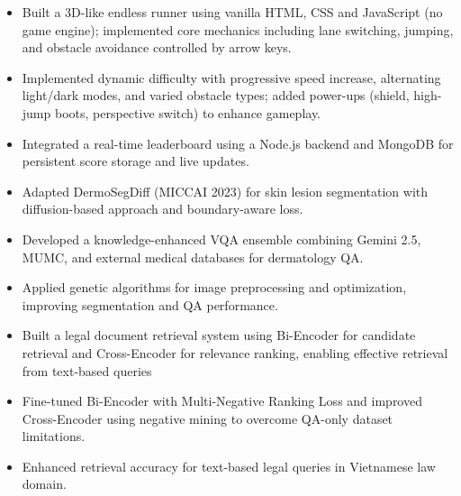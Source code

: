 \documentclass[11pt,a4paper,sans]{moderncv}
\begin{document}
{\begin{itemize}

  \item Built a 3D-like endless runner using vanilla HTML, CSS and JavaScript (no game engine); implemented core mechanics including lane switching, jumping, and obstacle avoidance controlled by arrow keys.

  \item Implemented dynamic difficulty with progressive speed increase, alternating light/dark modes, and varied obstacle types; added power-ups (shield, high-jump boots, perspective switch) to enhance gameplay.

  \item Integrated a real-time leaderboard using a Node.js backend and MongoDB for persistent score storage and live updates.

\end{itemize}}




{\begin{itemize}

  \item Adapted DermoSegDiff (MICCAI 2023) for skin lesion segmentation with diffusion-based approach and boundary-aware loss.

  \item Developed a knowledge-enhanced VQA ensemble combining Gemini 2.5, MUMC, and external medical databases for dermatology QA.

  \item Applied genetic algorithms for image preprocessing and optimization, improving segmentation and QA performance.

\end{itemize}}




{\begin{itemize}

  \item Built a legal document retrieval system using Bi-Encoder for candidate retrieval and Cross-Encoder for relevance ranking, enabling effective retrieval from text-based queries

  \item Fine-tuned Bi-Encoder with Multi-Negative Ranking Loss and improved Cross-Encoder using negative mining to overcome QA-only dataset limitations.

  \item Enhanced retrieval accuracy for text-based legal queries in Vietnamese law domain.

\end{itemize}}
\end{document}
